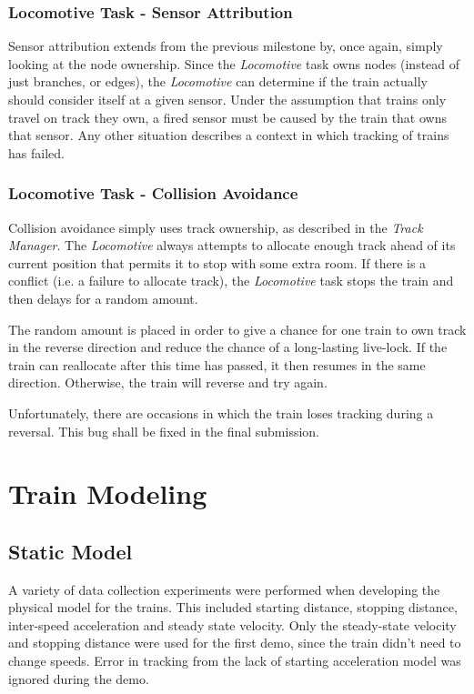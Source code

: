 \documentclass[twoside,a4paper]{refart}
\begin{document}
\subsubsection{Locomotive Task - Sensor Attribution}
Sensor attribution extends from the previous milestone by, once again, simply looking at the node ownership. Since the \textit{Locomotive} task owns nodes (instead of just branches, or edges), the \textit{Locomotive} can determine if the train actually should consider itself at a given sensor. Under the assumption that trains only travel on track they own, a fired sensor must be caused by the train that owns that sensor. Any other situation describes a context in which tracking of trains has failed.

\subsubsection{Locomotive Task - Collision Avoidance}
Collision avoidance simply uses track ownership, as described in the \textit{Track Manager}. The \textit{Locomotive} always attempts to allocate enough track ahead of its current position that permits it to stop with some extra room. If there is a conflict (i.e. a failure to allocate track), the \textit{Locomotive} task stops the train and then delays for a random amount.

The random amount is placed in order to give a chance for one train to own track in the reverse direction and reduce the chance of a long-lasting live-lock. If the train can reallocate after this time has passed, it then resumes in the same direction. Otherwise, the train will reverse and try again.

Unfortunately, there are occasions in which the train loses tracking during a reversal. This bug shall be fixed in the final submission.

\section{Train Modeling}

\subsection{Static Model}
A variety of data collection experiments were performed when developing the physical model for the trains. This included starting distance, stopping distance, inter-speed acceleration and steady state velocity. Only the steady-state velocity and stopping distance were used for the first demo, since the train didn't need to change speeds. Error in tracking from the lack of starting acceleration model was ignored during the demo.
\end{document}
